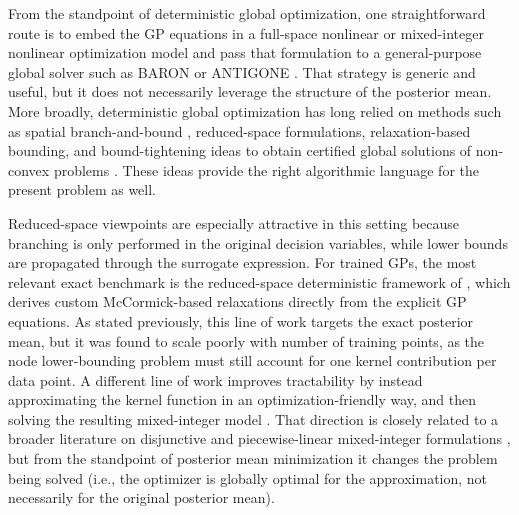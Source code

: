 \documentclass[pdflatex,sn-mathphys-num]{sn-jnl}%
\theoremstyle{thmstyleone}%
\theoremstyle{thmstyletwo}%
\theoremstyle{thmstylethree}%
\begin{document}
From the standpoint of deterministic global optimization, one straightforward route is to embed the GP equations in a full-space nonlinear or mixed-integer nonlinear optimization model and pass that formulation to a general-purpose global solver such as BARON \cite{ref:baron} or ANTIGONE \cite{ref:antigone}. That strategy is generic and useful, but it does not necessarily leverage the structure of the posterior mean. More broadly, deterministic global optimization has long relied on methods such as spatial branch-and-bound \cite{falk1969algorithm}, reduced-space formulations, relaxation-based bounding, and bound-tightening ideas to obtain certified global solutions of non-convex problems \cite{HorstTuy1996Global,RyooSahinidis1995Global,BelottiEtAl2009BT,BelottiEtAl2013MINLP}. These ideas provide the right algorithmic language for the present problem as well.

Reduced-space viewpoints are especially attractive in this setting because branching is only performed in the original decision variables, while lower bounds are propagated through the surrogate expression. For trained GPs, the most relevant exact benchmark is the reduced-space deterministic framework of \cite{ref:gp_embedded_exact}, which derives custom McCormick-based relaxations \cite{ref:reduced_space_bb,ref:deterministic_global_opt_text} directly from the explicit GP equations. As stated previously, this line of work targets the exact posterior mean, but it was found to scale poorly with number of training points, as the node lower-bounding problem must still account for one kernel contribution per data point. A different line of work improves tractability by instead approximating the kernel function in an optimization-friendly way, and then solving the resulting mixed-integer model \cite{ref:pwl_kernel_aistats}. That direction is closely related to a broader literature on disjunctive and piecewise-linear mixed-integer formulations \cite{VielmaNemhauser2011Disjunctive,HuchetteVielma2023Nonconvex,GrimstadKnudsen2020PWP}, but from the standpoint of posterior mean minimization it changes the problem being solved (i.e., the optimizer is globally optimal for the approximation, not necessarily for the original posterior mean). 
\end{document}
